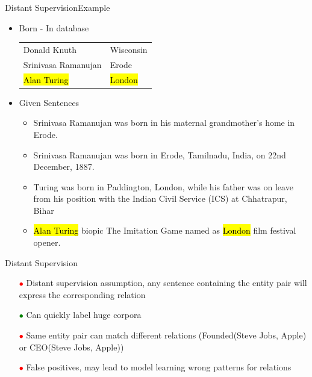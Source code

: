 \documentclass{beamer}
\makeatletter
\newcommand\SoulColor{%
  \let\set@color\beamerorig@set@color
  \let\reset@color\beamerorig@reset@color}
\makeatother
\begin{document}
\begin{frame}{Distant Supervision}{Example}
\begin{itemize}
 
\item Born - In database
 \begin{center}
\begin{tabular}{|l|l|}
\hline
Donald Knuth & Wisconsin \\
Srinivasa Ramanujan & Erode \\
\SoulColor\hl{Alan Turing} & \SoulColor\hl{London} \\
\hline
\end{tabular}
\end{center}
\item Given Sentences
\begin{itemize}
\item Srinivasa Ramanujan was born in his maternal grandmother’s home in Erode.
\item Srinivasa Ramanujan was born in Erode, Tamilnadu, India, on 22nd December, 1887.
\item Turing was born in Paddington, London, while his father was on leave from his position with the Indian Civil Service (ICS) at Chhatrapur, Bihar
\item \alert<+> {\SoulColor\hl{Alan Turing} biopic The Imitation Game named as \SoulColor\hl{London} film festival opener.}
\end{itemize}
\end{itemize}
 
\end{frame}

\begin{frame}{Distant Supervision}
\begin{itemize}
\item[\textcolor{red}{$\bullet$}] Distant supervision assumption, any sentence containing the entity pair will express the corresponding relation
\item[\textcolor{green}{$\bullet$}] Can quickly label huge corpora
\item[\textcolor{red}{$\bullet$}] Same entity pair can match different relations (Founded(Steve Jobs, Apple) or CEO(Steve Jobs, Apple))
\item[\textcolor{red}{$\bullet$}] False positives, may lead to model learning wrong patterns for relations
\end{itemize}
\end{frame}
\end{document}
